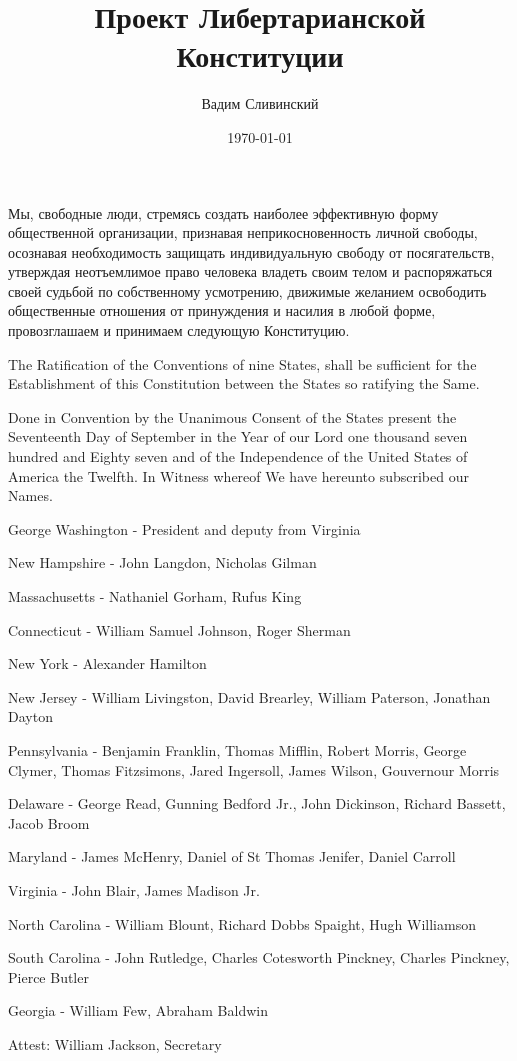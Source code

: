\documentclass[12pt]{constitution}
\begin{document}
\title{Проект Либертарианской Конституции}
\author{Вадим Сливинский}
\date{\today}
\maketitle
\setcounter{tocdepth}{0}
\tableofcontents
\newpage

Мы, свободные люди,
стремясь создать наиболее эффективную форму общественной организации,
признавая неприкосновенность личной свободы,
осознавая необходимость защищать индивидуальную свободу от посягательств,
утверждая неотъемлимое право человека владеть своим телом и распоряжаться своей судьбой по собственному усмотрению,
движимые желанием освободить общественные отношения от принуждения и насилия в любой форме,
провозглашаем и принимаем следующую Конституцию.



The Ratification of the Conventions of nine States, shall be sufficient for the
Establishment of this Constitution between the States so ratifying the Same.

Done in Convention by the Unanimous Consent of the States present the
Seventeenth Day of September in the Year of our Lord one thousand seven hundred
and Eighty seven and of the Independence of the United States of America the
Twelfth. In Witness whereof We have hereunto subscribed our Names.

George Washington - President and deputy from Virginia

New Hampshire - John Langdon, Nicholas Gilman

Massachusetts - Nathaniel Gorham, Rufus King

Connecticut - William Samuel Johnson, Roger Sherman

New York - Alexander Hamilton

New Jersey - William Livingston, David Brearley, William Paterson, Jonathan
Dayton

Pennsylvania - Benjamin Franklin, Thomas Mifflin, Robert Morris, George Clymer,
Thomas Fitzsimons, Jared Ingersoll, James Wilson, Gouvernour Morris

Delaware - George Read, Gunning Bedford Jr., John Dickinson, Richard Bassett,
Jacob Broom

Maryland - James McHenry, Daniel of St Thomas Jenifer, Daniel Carroll

Virginia - John Blair, James Madison Jr.

North Carolina - William Blount, Richard Dobbs Spaight, Hugh Williamson

South Carolina - John Rutledge, Charles Cotesworth Pinckney, Charles Pinckney,
Pierce Butler

Georgia - William Few, Abraham Baldwin

Attest: William Jackson, Secretary
\end{document}
